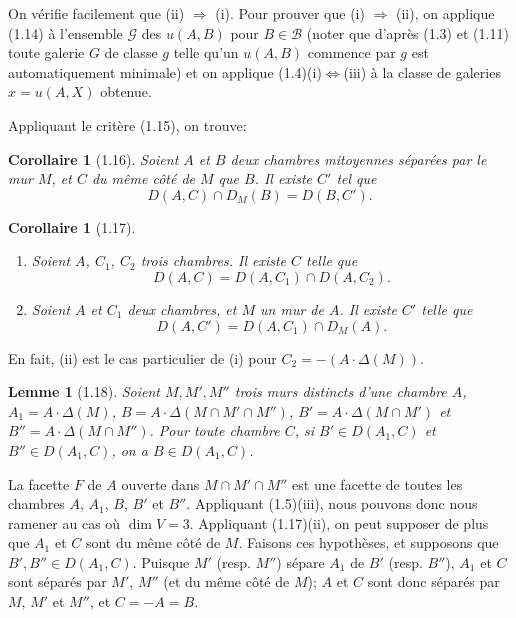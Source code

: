 \documentclass[12pt]{article}
\newtheorem{lemme}[theoreme]{Lemme}
\newtheorem{corollaire}[theoreme]{Corollaire}
\theoremstyle{remark}
\begin{document}
On vérifie facilement que (ii) $\Rightarrow$ (i). Pour prouver que (i) $\Rightarrow$ (ii), on applique (1.14) à l'ensemble $\mathscr{G}$ des $u(A, B)$ pour $B \in \mathscr{B}$ (noter que d'après (1.3) et (1.11) toute galerie $G$ de classe $g$ telle qu'un $u(A, B)$ commence par $g$ est automatiquement minimale) et on applique (1.4)(i)$\Leftrightarrow$(iii) à la classe de galeries $x = u(A, X)$ obtenue.

Appliquant le critère (1.15), on trouve:

\begin{corollaire}[1.16]
Soient $A$ et $B$ deux chambres mitoyennes séparées par le mur $M$, et $C$ du même côté de $M$ que $B$. Il existe $C'$ tel que
\[D(A, C) \cap D_M(B) = D(B, C').\]
\end{corollaire}

\begin{corollaire}[1.17]
\begin{enumerate}
\item[(i)] Soient $A$, $C_1$, $C_2$ trois chambres. Il existe $C$ telle que
\begin{equation}
D(A, C) = D(A, C_1) \cap D(A, C_2).\tag{1.17.1}
\end{equation}
\item[(ii)] Soient $A$ et $C_1$ deux chambres, et $M$ un mur de $A$. Il existe $C'$ telle que
\begin{equation}
D(A, C') = D(A, C_1) \cap D_M(A).\tag{1.17.2}
\end{equation}
\end{enumerate}
\end{corollaire}

En fait, (ii) est le cas particulier de (i) pour $C_2 = -(A \cdot \Delta(M))$.

\begin{lemme}[1.18]
Soient $M, M', M''$ trois murs distincts d'une chambre $A$, $A_1 = A \cdot \Delta(M)$, $B = A \cdot \Delta(M \cap M' \cap M'')$, $B' = A \cdot \Delta(M \cap M')$ et $B'' = A \cdot \Delta(M \cap M'')$. Pour toute chambre $C$, si $B' \in D(A_1, C)$ et $B'' \in D(A_1, C)$, on a $B \in D(A_1, C)$.
\end{lemme}

La facette $F$ de $A$ ouverte dans $M \cap M' \cap M''$ est une facette de toutes les chambres $A$, $A_1$, $B$, $B'$ et $B''$. Appliquant (1.5)(iii), nous pouvons donc nous ramener au cas où $\dim V = 3$. Appliquant (1.17)(ii), on peut supposer de plus que $A_1$ et $C$ sont du même côté de $M$. Faisons ces hypothèses, et supposons que $B', B'' \in D(A_1, C)$. Puisque $M'$ (resp. $M''$) sépare $A_1$ de $B'$ (resp. $B''$), $A_1$ et $C$ sont séparés par $M'$, $M''$ (et du même côté de $M$); $A$ et $C$ sont donc séparés par $M$, $M'$ et $M''$, et $C = -A = B$.
\end{document}
